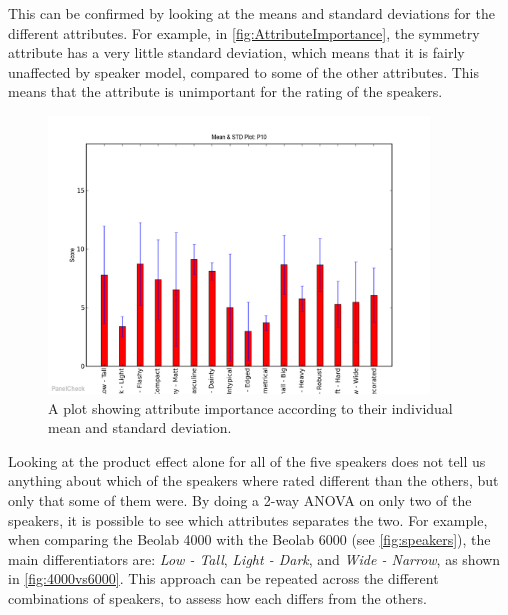 \newpage
\noindent
%
This can be confirmed by looking at the means and standard deviations for the different attributes. For example, in \autoref{fig:AttributeImportance}, the symmetry attribute has a very little standard deviation, which means that it is fairly unaffected by speaker model, compared to some of the other attributes. This means that the attribute is unimportant for the rating of the speakers.
%
\begin{figure}[H]
\centering
\includegraphics[width =0.9\textwidth]{Figure/AttributeImportance.png} 
\caption{A plot showing attribute importance according to their individual mean and standard deviation.}
\label{fig:AttributeImportance}
\end{figure}
\newpage
\noindent
%
Looking at the product effect alone for all of the five speakers does not tell us anything about which of the speakers where rated different than the others, but only that some of them were. By doing a 2-way ANOVA on only two of the speakers, it is possible to see which attributes separates the two. For example, when comparing the Beolab 4000 with the Beolab 6000 (see \autoref{fig:speakers}), the main differentiators are: \textit{Low - Tall}, \textit{Light - Dark}, and \textit{Wide - Narrow}, as shown in \autoref{fig:4000vs6000}. This approach can be repeated across the different combinations of speakers, to assess how each differs from the others.
%
